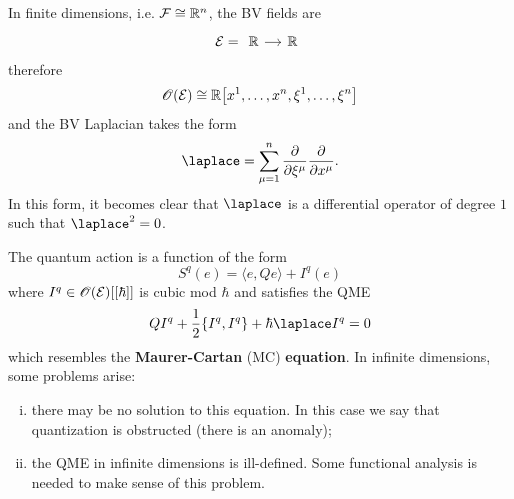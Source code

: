 \begin{example}
  In finite dimensions, i.e. $\mathcal{F} \cong \mathbb{R}^n$, the BV fields are
  \begin{equation*}
    \Ecal =
    \begin{tikzcd}[sep=small]
      \Rbb \arrow[r] & \Rbb
    \end{tikzcd}
  \end{equation*}
  therefore
  \begin{equation*}
    \mathscr{O}(\mathcal{E}) \cong \mathbb{R} \bigl[ x^1, \dots, x^n, \xi^1, \dots, \xi^n \bigr]
  \end{equation*}
  and the BV Laplacian takes the form
  \begin{equation*}
    \laplace = \sum_{\mu = 1}^n \frac{\partial}{\partial \xi^\mu} \frac{\partial}{\partial x^\mu}.
  \end{equation*}
  In this form, it becomes clear that $\laplace$ is a differential operator of degree $1$ such that $\laplace^2 = 0$.
\end{example}
The quantum action is a function of the form
\begin{equation*}
  S^q(e) = \langle e, Qe \rangle
  + I^q(e)
\end{equation*}
where $I^q \in \mathscr{O}(\mathcal{E}) [[\hbar]]$ is cubic mod $\hbar$ and satisfies the QME
\begin{equation*}
  Q I^q + \frac{1}{2} \{I^q, I^q\} + \hbar \laplace I^q = 0
\end{equation*}
which resembles the \textbf{Maurer-Cartan} (MC) \textbf{equation}. In infinite dimensions, some problems arise:

\begin{enumerate}[i)]
  \item there may be no solution to this equation. In this case we say that quantization is obstructed (there is an anomaly);
  \item the QME in infinite dimensions is ill-defined. Some functional analysis is needed to make sense of this problem.
\end{enumerate}
